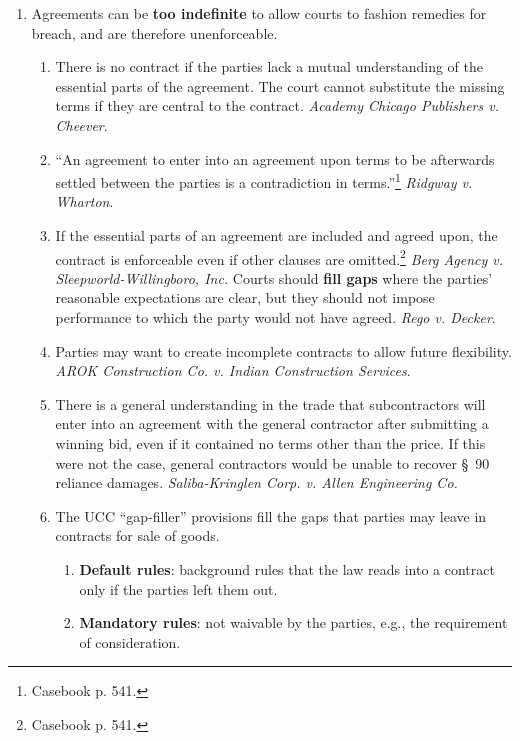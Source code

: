 \begin{enumerate}
    \item Agreements can be \textbf{too indefinite} to allow courts to fashion 
    remedies for breach, and are therefore unenforceable.
    \begin{enumerate}
        \item There is no contract if the parties lack a mutual understanding 
        of the essential parts of the agreement. The court cannot substitute 
        the missing terms if they are central to the contract. \emph{Academy 
        Chicago Publishers v. Cheever}. 
        \item ``An agreement to enter into an agreement upon terms to be 
        afterwards settled between the parties is a contradiction in 
        terms.''\footnote{Casebook p. 541.} \emph{Ridgway v. Wharton}.
        \item If the essential parts of an agreement are included and agreed 
        upon, the contract is enforceable even if other clauses are 
        omitted.\footnote{Casebook p. 541.} \emph{Berg Agency v. 
        Sleepworld-Willingboro, Inc.} Courts should \textbf{fill gaps} where 
        the parties' reasonable expectations are clear, but they should not 
        impose performance to which the party would not have agreed. 
        \emph{Rego v. Decker}.
        \item Parties may want to create incomplete contracts to allow future 
        flexibility. \emph{AROK Construction Co. v. Indian Construction 
        Services}.
        \item There is a general understanding in the trade that 
        subcontractors will enter into an agreement with the general 
        contractor after submitting a winning bid, even if it contained no 
        terms other than the price. If this were not the case, general 
        contractors would be unable to recover \S\ 90 reliance damages. 
        \emph{Saliba-Kringlen Corp. v. Allen Engineering Co.}
        \item The UCC ``gap-filler'' provisions fill the gaps that parties may 
        leave in contracts for sale of goods.
        \begin{enumerate}
            \item \textbf{Default rules}: background rules that the law reads 
            into a contract only if the parties left them out.
            \item \textbf{Mandatory rules}: not waivable by the parties, e.g., 
            the requirement of consideration.

\end{enumerate}
\end{enumerate}
\end{enumerate}
